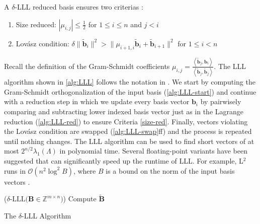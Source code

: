 A $\delta$-LLL reduced basis ensures two criterias \cite{LLL82}:
\begin{enumerate}
  \item Size reduced: $|\mu_{i,j}| \leq \frac{1}{2}$ for $1\leq i \leq n$ and $j < i$ \label{size-red}
  \item Lovász condition: $\delta \| \tilde{\mathbf{b}}_i \|^2 > \| \mu_{i+1, i} \tilde{\mathbf{b}}_i + \tilde{\mathbf{b}}_{i+1} \|^2$ for $1\leq i < n$
\end{enumerate}

Recall the definition of the Gram-Schmidt coefficients $\mu_{i, j} = \frac{\left\langle \tilde{\mathbf{b}}_j, \mathbf{b}_i\right\rangle}{\left\langle \tilde{\mathbf{b}}_j, \tilde{\mathbf{b}}_j\right\rangle}$. The LLL algorithm shown in \cref{alg:LLL} follows the notation in \cite{LLLReg04}. We start by computing the Gram-Schmidt orthogonalization of the input basis (\cref{alg:LLL-start}) and continue with a reduction step in which we update every basis vector $\mathbf{b}_i$ by pairwisely comparing and subtracting lower indexed basis vector just as in the Lagrange reduction (\cref{alg:LLL-red}) to ensure Criteria \ref{size-red}. Finally, vectors violating the Lovász condition are swapped (\cref{alg:LLL-swap}ff) and the process is repeated until nothing changes. The LLL algorithm can be used to find short vectors of at most $2^{n/2} \lambda_1(\Lambda)$ in polynomial time. Several floating-point variants have been suggested that can significantly speed up the runtime of LLL. For example, L$^2$ runs in $\mathcal{O}(n^2 \log^2 B)$, where $B$ is a bound on the norm of the input basis vectors \cite{NS05}. %

\begin{algorithm2e}
  \Begin($\delta\text{-LLL} {(}\mathbf{B} \in \mathbb{Z}^{m\times n} {)}$) %
  {
    Compute $\tilde{\mathbf{B}}$\label{alg:LLL-start}\\
  }
  \caption{The $\delta$-LLL Algorithm \cite{LLL82}} \label{alg:LLL}
\end{algorithm2e}




